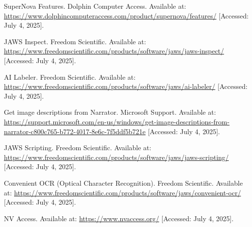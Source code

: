 \begin{thebibliography}{99}
 SuperNova Features. Dolphin Computer Access. Available at: \url{https://www.dolphincomputeraccess.com/product/supernova/features/} [Accessed: July 4, 2025].

 JAWS Inspect. Freedom Scientific. Available at: \url{https://www.freedomscientific.com/products/software/jaws/jaws-inspect/} [Accessed: July 4, 2025].

 AI Labeler. Freedom Scientific. Available at: \url{https://www.freedomscientific.com/products/software/jaws/ai-labeler/} [Accessed: July 4, 2025].

 Get image descriptions from Narrator. Microsoft Support. Available at: \url{https://support.microsoft.com/en-us/windows/get-image-descriptions-from-narrator-c800c765-b772-4017-8e6c-7f5ddf5b721e} [Accessed: July 4, 2025].

 JAWS Scripting. Freedom Scientific. Available at: \url{https://www.freedomscientific.com/products/software/jaws/jaws-scripting/} [Accessed: July 4, 2025].

 Convenient OCR (Optical Character Recognition). Freedom Scientific. Available at: \url{https://www.freedomscientific.com/products/software/jaws/convenient-ocr/} [Accessed: July 4, 2025].

 NV Access. Available at: \url{https://www.nvaccess.org/} [Accessed: July 4, 2025].

\end{thebibliography}
